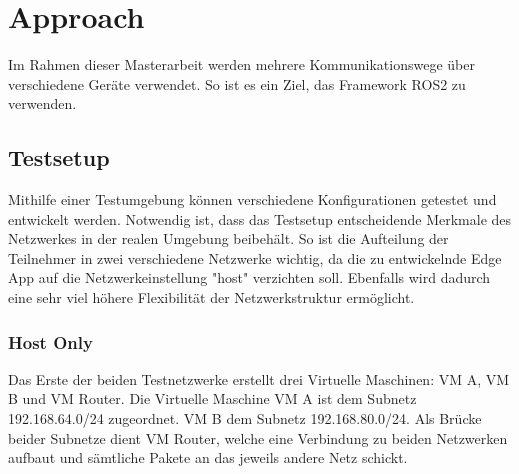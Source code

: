 \chapter{Approach}
\label{Approach}
	Im Rahmen dieser Masterarbeit werden mehrere Kommunikationswege über verschiedene Geräte verwendet.
	So ist es ein Ziel, das Framework ROS2 zu verwenden.
		
	\section{Testsetup}
	\label{Voruntersuchungen:Testsetup}
		Mithilfe einer Testumgebung können verschiedene Konfigurationen getestet und entwickelt werden.
		Notwendig ist, dass das Testsetup entscheidende Merkmale des Netzwerkes in der realen Umgebung beibehält.
		So ist die Aufteilung der Teilnehmer in zwei verschiedene Netzwerke wichtig, da die zu entwickelnde Edge App auf die Netzwerkeinstellung "host" verzichten soll.
		Ebenfalls wird dadurch eine sehr viel höhere Flexibilität der Netzwerkstruktur ermöglicht. 
				
		\subsection{Host Only}
		\label{Voruntersuchungen:Testsetup:HostOnly}
			Das Erste der beiden Testnetzwerke erstellt drei Virtuelle Maschinen: VM A, VM B und VM Router.
			Die Virtuelle Maschine VM A ist dem Subnetz 192.168.64.0/24 zugeordnet. VM B dem Subnetz 192.168.80.0/24.
			Als Brücke beider Subnetze dient VM Router, welche eine Verbindung zu beiden Netzwerken aufbaut und sämtliche Pakete an das jeweils andere Netz schickt.
			
		
	